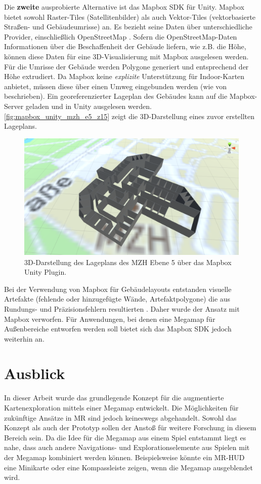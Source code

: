 Die \textbf{zweite} ausprobierte Alternative ist das Mapbox SDK für Unity.
Mapbox bietet sowohl Raster-Tiles (Satellitenbilder) als auch Vektor-Tiles (vektorbasierte Straßen- und Gebäudeumrisse) an.
Es bezieht seine Daten über unterschiedliche Provider, einschließlich OpenStreetMap \autocite{Mapbox2018}.
Sofern die OpenStreetMap-Daten Informationen über die Beschaffenheit der Gebäude liefern, wie z.B. die Höhe, können diese Daten für eine 3D-Visualisierung mit Mapbox ausgelesen werden.
Für die Umrisse der Gebäude werden Polygone generiert und entsprechend der Höhe extrudiert.
Da Mapbox keine \emph{explizite} Unterstützung für Indoor-Karten anbietet, müssen diese über einen Umweg eingebunden werden (wie von \textcites{Mapbox2018b}{Pavani2018}{Clarke2017} beschrieben).
Ein georeferenzierter Lageplan des Gebäudes kann auf die Mapbox-Server geladen und in Unity ausgelesen werden.
\autoref{fig:mapbox_unity_mzh_e5_z15} zeigt die 3D-Darstellung eines zuvor erstellten Lageplans.
\begin{figure}[h]
    \centering
    \includegraphics[width=0.65\linewidth]{figures/mapbox_unity_mzh_e5_z15_working}
    \caption{3D-Darstellung des Lageplans des MZH Ebene 5 über das Mapbox Unity Plugin.}
    \label{fig:mapbox_unity_mzh_e5_z15}
\end{figure}
Bei der Verwendung von Mapbox für Gebäudelayouts entstanden visuelle Artefakte (fehlende oder hinzugefügte Wände, Artefaktpolygone) die aus Rundungs- und Präzisionsfehlern resultierten \parencites{Kahyaoglu2017}{Mapbox2018c}.
Daher wurde der Ansatz mit Mapbox verworfen.
Für Anwendungen, bei denen eine Megamap für Außenbereiche entworfen werden soll bietet sich das Mapbox SDK jedoch weiterhin an.

\section{Ausblick}
In dieser Arbeit wurde das grundlegende Konzept für die augmentierte Kartenexploration mittels einer Megamap entwickelt.
Die Möglichkeiten für zukünftige Ansätze in MR sind jedoch keineswegs abgehandelt.
Sowohl das Konzept als auch der Prototyp sollen der Anstoß für weitere Forschung in diesem Bereich sein.
Da die Idee für die Megamap aus einem Spiel entstammt liegt es nahe, dass auch andere Navigations- und Explorationselemente aus Spielen mit der Megamap kombiniert werden können.
Beispielsweise könnte ein MR-HUD eine Minikarte oder eine Kompassleiste zeigen, wenn die Megamap ausgeblendet wird.

